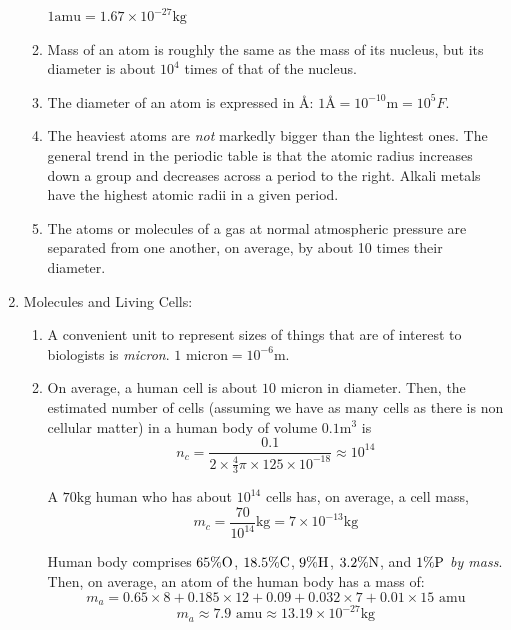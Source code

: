 \documentclass[12pt,a4paper]{book}
\begin{document}
\begin{enumerate}
\begin{enumerate}
                $1 \text{amu} = 1.67\times 10^{-27}\si{\kg}$
            \item Mass of an atom is roughly the same as the mass of its nucleus, but its diameter is about $10^4$ times of that of the nucleus.
            \item The diameter of an atom is expressed in \si{\angstrom}:
                $1\si{\angstrom} = 10^{-10}\si{\m} = 10^5 F$.
            \item The heaviest atoms are \emph{not} markedly bigger than the lightest ones. The general trend in the periodic table is that the atomic radius increases down a group and decreases across a period to the right. Alkali metals have the highest atomic radii in a given period.        
            \item The atoms or molecules of a gas at normal atmospheric pressure are separated from one another, on average, by about 10 times their diameter. 
        \end{enumerate}
    \item Molecules and Living Cells:
        \begin{enumerate}
            \item A convenient unit to represent sizes of things that are of interest to biologists is \emph{micron}. $1 \text{ micron}=10^{-6}\si{\m}$. 
            \item On average, a human cell is about $10\text{ micron}$ in diameter. Then, the estimated number of cells (assuming we have as many cells as there is non cellular matter) in a human body of volume $0.1\si{\cubic\metre}$ is 
                $$
                    n_c = \frac{0.1}{2\times\frac{4}{3}\pi\times125\times10^{-18}}
                    \approx 10^{14}
                $$
                
                A $70\si{\kg}$ human who has about $10^{14}$ cells has, on average, a cell mass, 
                $$
                    m_c = \frac{70}{10^{14}}\si{\kg} = 7\times10^{-13}\si{\kg}
                $$

                Human body comprises $65\% \ce{O}$, $18.5\% \ce{C}$, $9\% \ce{H}$, $3.2\% \ce{N}$, and $1\% \ce{P}$ \emph{by mass}. Then, on average, an atom of the human body has a mass of:
                $$
                    m_a = 0.65\times 8 + 0.185\times 12 + 0.09 + 0.032\times 7 + 0.01\times 15 \text{ amu}
                $$
                $$
                    m_a \approx 7.9 \text{ amu} \approx 13.19\times10^{-27}\si{\kg}
                $$


\end{enumerate}
\end{enumerate}
\end{document}
